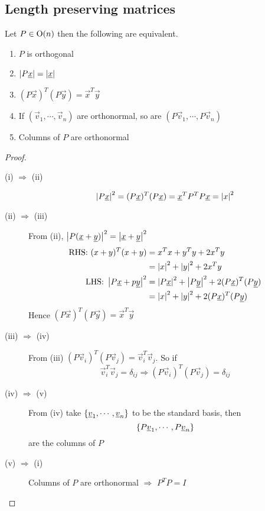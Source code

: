 \documentclass{article}
\numberwithin{equation}{section}
\begin{document}
\subsection{Length preserving matrices}
Let $P \in \mathrm{O}(n)$ then the following are equivalent.
\begin{enumerate}
    \item $P$ is orthogonal
    \item $\left\lvert P\underline{x}\right\rvert = \left\lvert \underline{x}\right\rvert$
    \item $(P\vec x)^T (P \vec y) = \vec x^T \vec y$
    \item If $(\vec v_1, \cdots, \vec v_n)$ are orthonormal, so are $(P\vec v_1, \cdots, P\vec v_n)$
    \item Columns of $P$ are orthonormal
\end{enumerate}
\begin{proof}\leavevmode
    \begin{description}
        \item[(i) $\Rightarrow$ (ii)] 
        \[
            \left\lvert P\underline{x}\right\rvert^2 = (P\underline{x})^T(P\underline{x}) = \underline{x}^T P^TP \underline{x} = \left\lvert x\right\rvert^2
        \]
        \item[(ii) $\Rightarrow$ (iii)] From (ii), $\left\lvert P(\underline{x} + \underline{y})\right\rvert^2 = \left\lvert \underline{x} + \underline{y}\right\rvert^2$
        \begin{align*}
            \text{RHS: } (x + y)^T(x + y) &= x^Tx + y^Ty + 2x^Ty \\
            &= \left\lvert x\right\rvert^2 + \left\lvert y\right\rvert^2 + 2x^Ty \\ 
            \text{LHS: } \left\lvert P\underline{x} + p\underline{y}\right\rvert^2 &= \left\lvert P\underline{x}\right\rvert^2 + \left\lvert P\underline{y}\right\rvert^2 + 2(P \underline{x})^T(P \underline{y}) \\
            &= \left\lvert x\right\rvert^2 + \left\lvert y\right\rvert^2 + 2(P \underline{x})^T(P \underline{y})
        \end{align*}
        Hence $(P \vec x)^T(P \vec y) = \vec x^T \vec y$
        \item[(iii) $\Rightarrow$ (iv)] From (iii) $(P \vec v_i)^T(P \vec v_j) = \vec v_i^T \vec v_j$.
        So if 
        \[
            \vec v_i^T \vec v_j = \delta_{ij} \Rightarrow (P \vec v_i)^T(P \vec v_j) = \delta_{ij}
        \]
        \item[(iv) $\Rightarrow$ (v)] From (iv) take $\left\{ \underline{v}_1, \cdots, \underline{v}_n \right\}$ to be the standard basis, then 
        \[
            \left\{ P\underline{v}_1, \cdots, P\underline{v}_n \right\}  
        \]
        are the columns of $P$
        \item[(v) $\Rightarrow$ (i)] Columns of $P$ are orthonormal $\Rightarrow$ $P^TP = I$
    \end{description}
\end{proof}
\end{document}
